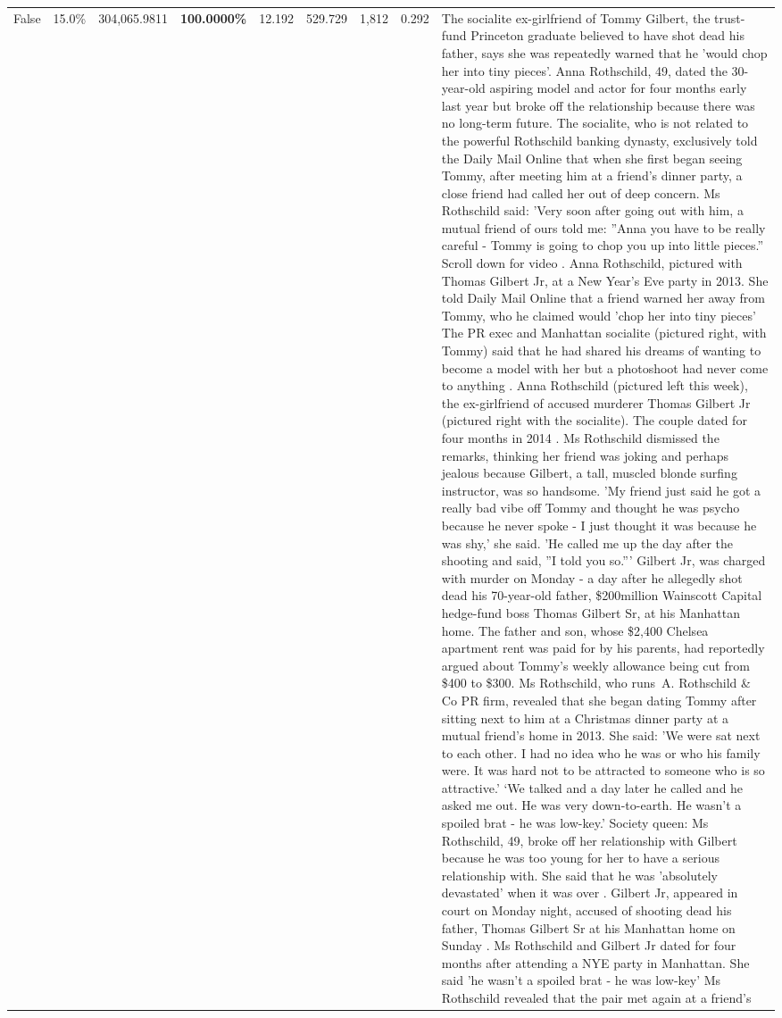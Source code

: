 \begin{table}[H]
\begin{tabular}{lllrlllll}
False & 15.0\% & \color{red} 304,065.9811 & \bfseries \color{red} 100.0000\% & 12.192 & 529.729 & 1,812 & 0.292 & The socialite ex-girlfriend of Tommy Gilbert, the trust-fund Princeton graduate believed to have shot dead his father, says she was repeatedly warned that he 'would chop her into tiny pieces'. Anna Rothschild, 49, dated the 30-year-old aspiring model and actor for four months early last year but broke off the relationship because there was no long-term future. The socialite, who is not related to the powerful Rothschild banking dynasty, exclusively told the Daily Mail Online that when she first began seeing Tommy, after meeting him at a friend's dinner party, a close friend had called her out of deep concern. Ms Rothschild said: 'Very soon after going out with him, a mutual friend of ours told me: ''Anna you have to be really careful - Tommy is going to chop you up into little pieces.'' Scroll down for video . Anna Rothschild, pictured with Thomas Gilbert Jr, at a New Year's Eve party in 2013. She told Daily Mail Online that a friend warned her away from Tommy, who he claimed would 'chop her into tiny pieces' The PR exec and Manhattan socialite (pictured right, with Tommy) said that he had shared his dreams of wanting to become a model with her but a photoshoot had never come to anything . Anna Rothschild (pictured left this week), the ex-girlfriend of accused murderer Thomas Gilbert Jr (pictured right with the socialite). The couple dated for four months in 2014 . Ms Rothschild dismissed the remarks, thinking her friend was joking and perhaps jealous because Gilbert, a tall, muscled blonde surfing instructor, was so handsome. 'My friend just said he got a really bad vibe off Tommy and thought he was psycho because he never spoke - I just thought it was because he was shy,' she said. 'He called me up the day after the shooting and said, ''I told you so.''' Gilbert Jr, was charged with murder on Monday - a day after he allegedly shot dead his 70-year-old father, \$200million Wainscott Capital hedge-fund boss Thomas Gilbert Sr, at his Manhattan home. The father and son, whose \$2,400 Chelsea apartment rent was paid for by his parents, had reportedly argued about Tommy's weekly allowance being cut from \$400 to \$300. Ms Rothschild, who runs A. Rothschild \& Co PR firm, revealed that she began dating Tommy after sitting next to him at a Christmas dinner party at a mutual friend's home in 2013. She said: 'We were sat next to each other. I had no idea who he was or who his family were. It was hard not to be attracted to someone who is so attractive.' ‘We talked and a day later he called and he asked me out. He was very down-to-earth. He wasn’t a spoiled brat - he was low-key.’ Society queen: Ms Rothschild, 49, broke off her relationship with Gilbert because he was too young for her to have a serious relationship with. She said that he was 'absolutely devastated' when it was over . Gilbert Jr, appeared in court on Monday night, accused of shooting dead his father, Thomas Gilbert Sr at his Manhattan home on Sunday . Ms Rothschild and Gilbert Jr dated for four months after attending a NYE party in Manhattan. She said 'he wasn't a spoiled brat - he was low-key' Ms Rothschild revealed that the pair met again at a friend’s 
\end{tabular}
\end{table}
